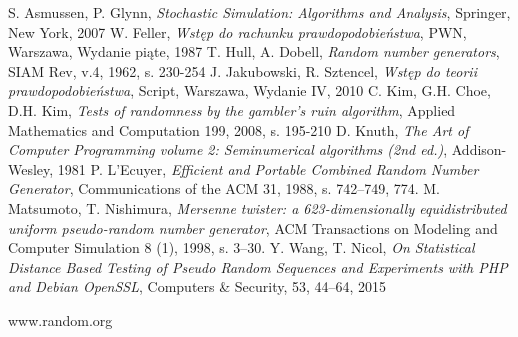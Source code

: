 \documentclass[a4paper,11pt,twoside]{book}
\theoremstyle{definition}
\begin{document}
\begin{thebibliography}{99}
    S. Asmussen, P. Glynn, \emph{Stochastic Simulation: Algorithms and Analysis}, Springer, New York, 2007
    W. Feller, \emph{Wstęp do rachunku prawdopodobieństwa}, PWN, Warszawa, Wydanie piąte, 1987
    T. Hull, A. Dobell, \emph{Random number generators}, SIAM Rev, v.4, 1962, s. 230-254
    J. Jakubowski, R. Sztencel, \emph{Wstęp do teorii prawdopodobieństwa}, Script, Warszawa, Wydanie IV, 2010
    C. Kim, G.H. Choe, D.H. Kim, \emph{Tests of randomness by the gambler's ruin algorithm},  Applied Mathematics and Computation 199, 2008, s. 195-210
    D. Knuth, \emph{The Art of Computer Programming volume 2: Seminumerical algorithms (2nd ed.)}, Addison-Wesley, 1981
    P. L'Ecuyer, \emph{Efficient and Portable Combined Random Number Generator}, Communications of the ACM 31, 1988, s. 742–749, 774.
    M. Matsumoto, T. Nishimura, \emph{Mersenne twister: a 623-dimensionally equidistributed uniform pseudo-random number generator}, ACM Transactions on Modeling and Computer Simulation 8 (1), 1998, s. 3–30.
    Y. Wang, T. Nicol, \emph{On Statistical Distance Based Testing of Pseudo Random Sequences and Experiments with PHP and Debian OpenSSL}, Computers \& Security, 53, 44--64, 2015


    www.random.org
\end{thebibliography}
\end{document}
